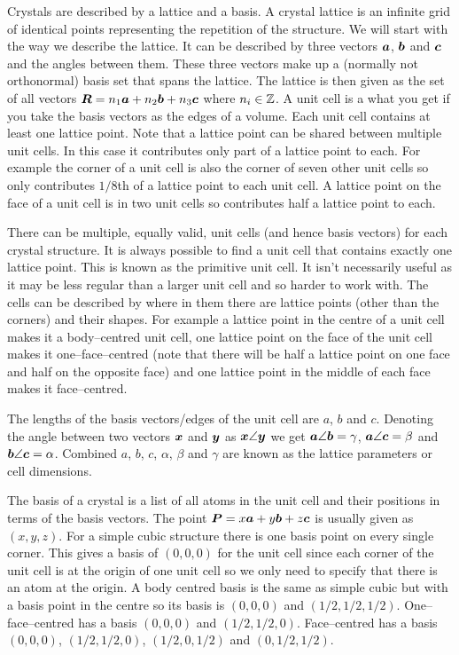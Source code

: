     Crystals are described by a lattice and a basis.
    A crystal lattice is an infinite grid of identical points representing the repetition of the structure.
    We will start with the way we describe the lattice.
    It can be described by three vectors \(\bm{a}\), \(\bm{b}\) and \(\bm{c}\) and the angles between them.
    These three vectors make up a (normally not orthonormal) basis set that spans the lattice.
    The lattice is then given as the set of all vectors \(\bm{R} = n_1\bm{a} + n_2\bm{b} + n_3\bm{c}\) where \(n_i\in\mathbb{Z}\).
    A unit cell is a what you get if you take the basis vectors as the edges of a volume.
    Each unit cell contains at least one lattice point.
    Note that a lattice point can be shared between multiple unit cells.
    In this case it contributes only part of a lattice point to each.
    For example the corner of a unit cell is also the corner of seven other unit cells so only contributes \(1/8\)th of a lattice point to each unit cell.
    A lattice point on the face of a unit cell is in two unit cells so contributes half a lattice point to each.
    
    There can be multiple, equally valid, unit cells (and hence basis vectors) for each crystal structure.
    It is always possible to find a unit cell that contains exactly one lattice point.
    This is known as the primitive unit cell.
    It isn't necessarily useful as it may be less regular than a larger unit cell and so harder to work with.
    The cells can be described by where in them there are lattice points (other than the corners) and their shapes.
    For example a lattice point in the centre of a unit cell makes it a body--centred unit cell, one lattice point on the face of the unit cell makes it one--face--centred (note that there will be half a lattice point on one face and half on the opposite face) and one lattice point in the middle of each face makes it face--centred.
    
    The lengths of the basis vectors/edges of the unit cell are \(a\), \(b\) and \(c\).
    Denoting the angle between two vectors \(\bm{x}\) and \(\bm{y}\) as \(\bm{x}\angle\bm{y}\) we get \(\bm{a}\angle\bm{b} = \gamma\), \(\bm{a}\angle\bm{c} = \beta\) and \(\bm{b}\angle\bm{c} = \alpha\).
    Combined \(a\), \(b\), \(c\), \(\alpha\), \(\beta\) and \(\gamma\) are known as the lattice parameters or cell dimensions.
    
    The basis of a crystal is a list of all atoms in the unit cell and their positions in terms of the basis vectors.
    The point \(\bm{P} = x\bm{a} + y\bm{b} + z\bm{c}\) is usually given as \((x, y, z)\).
    For a simple cubic structure there is one basis point on every single corner.
    This gives a basis of \((0, 0, 0)\) for the unit cell since each corner of the unit cell is at the origin of one unit cell so we only need to specify that there is an atom at the origin.
    A body centred basis is the same as simple cubic but with a basis point in the centre so its basis is \((0, 0, 0)\) and \((1/2, 1/2, 1/2)\).
    One--face--centred has a basis \((0, 0, 0)\) and \((1/2, 1/2, 0)\).
    Face--centred has a basis \((0, 0, 0)\), \((1/2, 1/2, 0)\), \((1/2, 0, 1/2)\) and \((0, 1/2, 1/2)\).
    
